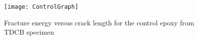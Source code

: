 \documentclass[numbers=noendperiod,chapterprefix=on]{icldt} %
\begin{document}


%

\begin{figure}[!htpb]
\centering
\texttt{[image: ControlGraph]}
\caption{Fracture energy versus crack length for the control epoxy from TDCB specimen} %
\end{figure}
\end{document}
